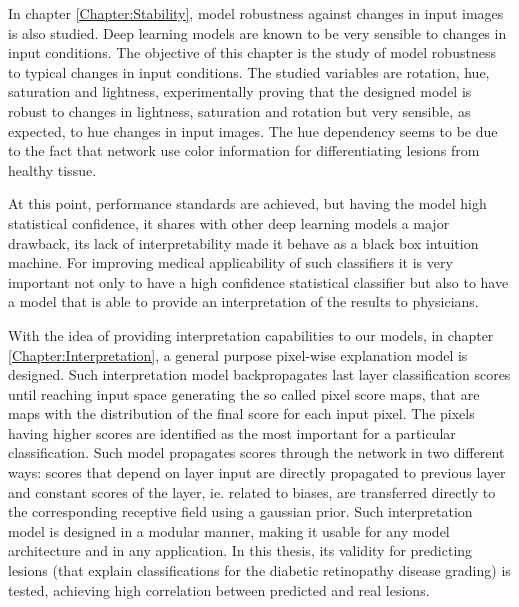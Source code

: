 In chapter \ref{Chapter:Stability}, model robustness against changes in input images is also studied. Deep learning models are known to be very sensible to changes in input conditions. The objective of this chapter is the study of model robustness to typical changes in input conditions. The studied variables are rotation, hue, saturation and lightness, experimentally proving that the designed model is robust to changes in lightness, saturation and rotation but very sensible, as expected, to hue changes in input images. The hue dependency seems to be due to the fact that network use color information for differentiating lesions from healthy tissue.

At this point, performance standards are achieved, but having the model high statistical confidence, it shares with other deep learning models a major drawback, its lack of interpretability made it behave as a black box intuition machine. For improving medical applicability of such classifiers it is very important not only to have a high confidence statistical classifier but also to have a model that is able to provide an interpretation of the results to physicians.

With the idea of providing interpretation capabilities to our models, in chapter \ref{Chapter:Interpretation}, a general purpose pixel-wise explanation model is designed. Such interpretation model backpropagates last layer classification scores until reaching input space generating the so called pixel score maps, that are maps with the distribution of the final score for each input pixel. The pixels having higher scores are identified as the most important for a particular classification. Such model propagates scores through the network in two different ways: scores that depend on layer input are directly propagated to previous layer and constant scores of the layer, ie. related to biases, are transferred directly to the corresponding receptive field using a gaussian prior. Such interpretation model is designed in a modular manner, making it usable for any model architecture and in any application. In this thesis, its validity for predicting lesions (that explain classifications for the diabetic retinopathy disease grading) is tested, achieving high correlation between predicted and real lesions. 

